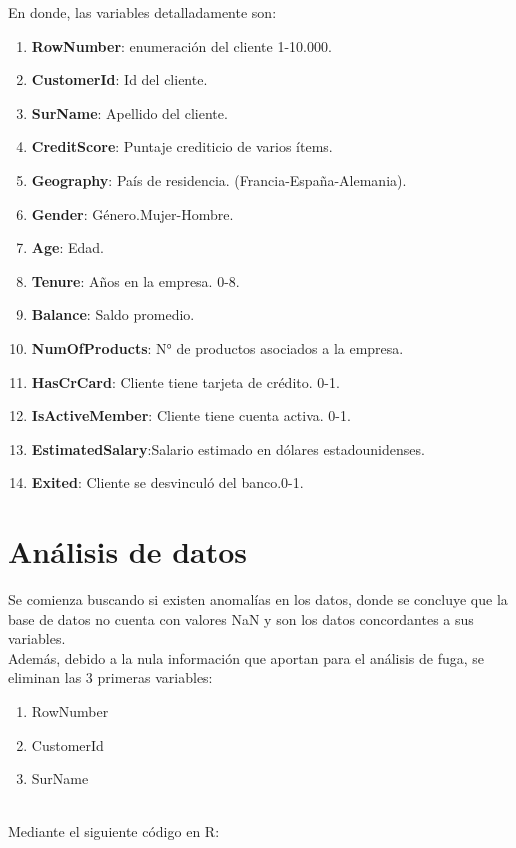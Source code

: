 \documentclass{report}
\begin{document}
En donde, las variables detalladamente son:\\
        \begin{enumerate}
            \item \textbf{RowNumber}: enumeración del cliente 1-10.000.
            \item \textbf{CustomerId}: Id del cliente.
            \item \textbf{SurName}: Apellido del cliente.
            \item \textbf{CreditScore}: Puntaje crediticio de varios ítems.
            \item \textbf{Geography}: País de residencia. (Francia-España-Alemania).
            \item \textbf{Gender}: Género.Mujer-Hombre.
            \item \textbf{Age}: Edad.
            \item \textbf{Tenure}: Años en la empresa. 0-8.
            \item \textbf{Balance}: Saldo promedio.
            \item \textbf{NumOfProducts}: N° de productos asociados a la empresa.
            \item \textbf{HasCrCard}: Cliente tiene tarjeta de crédito. 0-1.
            \item \textbf{IsActiveMember}: Cliente tiene cuenta activa. 0-1.
            \item \textbf{EstimatedSalary}:Salario estimado en dólares estadounidenses.
            \item \textbf{Exited}: Cliente se desvinculó del banco.0-1.
        \end{enumerate}
\newpage
\section{Análisis de datos}
Se comienza buscando si existen anomalías en los datos, donde se concluye que la base de datos no cuenta con valores NaN y son los datos concordantes a sus variables.\\

Además, debido a la nula información que aportan para el análisis de fuga, se eliminan las 3 primeras variables:\\
        \begin{enumerate}
            \item RowNumber
            \item CustomerId
            \item SurName
        \end{enumerate}\\
Mediante el siguiente código en R:
\end{document}
